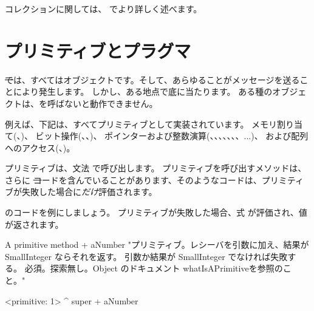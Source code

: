 \documentclass[a4paper,10pt,twoside]{book}
\begin{document}
コレクションに関しては、 でより詳しく述べます。

\section{プリミティブとプラグマ}

\st では、すべてはオブジェクトです。そして、あらゆることがメッセージを送ることにより発生します。
しかし、ある地点で底に当たります。
ある種のオブジェクトは、を呼ばないと動作できません。

例えば、下記は、すべてプリミティブとして実装されています。
メモリ割り当て(、)、
ビット操作(、、)、
ポインターおよび整数演算(\ct{+}、\ct{-}、\ct{<}、\ct{>}、\ct{*}、\ct{/ }、\ct{=}、\ct{==}...)、
および配列へのアクセス(、)。

プリミティブは、文法  で呼び出します。
プリミティブを呼び出すメソッドは、さらに \st コードを含んでいることがあります、そのようなコードは、プリミティブが失敗した場合に\emph{だけ}評価されます。

のコードを例にしましょう。
プリミティブが失敗した場合、式  が評価され、値が返されます。

\begin{method}[primitive]{A primitive method}
+ aNumber 
  "プリミティブ。レシーバを引数に加え、結果が SmallInteger ならそれを返す。
  引数か結果が SmallInteger でなければ失敗する。
  必須。探索無し。Object のドキュメント whatIsAPrimitiveを参照のこと。"

  <primitive: 1>
  ^ super + aNumber
\end{method}

\end{document}
